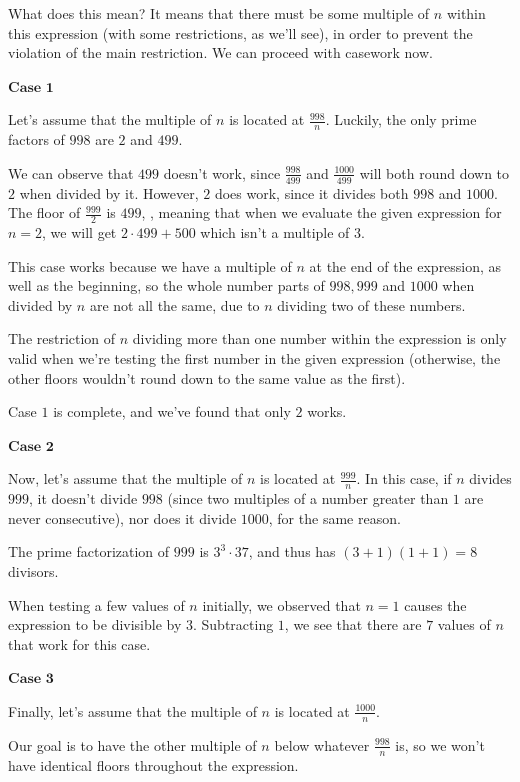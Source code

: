 \begin{enumerate}
 
What does this mean? It means that there must be some multiple of $n$ within this expression (with some restrictions, as we'll see), in order to prevent the violation of the main restriction. We can proceed with casework now.

 
$\textbf{Case 1}$

 
Let's assume that the multiple of $n$ is located at $\frac{998}{n}$. Luckily, the only prime factors of $998$ are $2$ and $499$. 

 
We can observe that $499$ doesn't work, since $\frac{998}{499}$ and $\frac{1000}{499}$ will both round down to $2$ when divided by it. However, $2$ does work, since it divides both $998$ and $1000$. The floor of $\frac{999}{2}$ is $499$, , meaning that when we evaluate the given expression for $n=2$, we will get $2\cdot{499}+500$ which isn't a multiple of $3$. 

 
This case works because we have a multiple of $n$ at the end of the expression, as well as the beginning, so the whole number parts of $998, 999$ and $1000$ when divided by $n$ are not all the same, due to $n$ dividing two of these numbers. 

 The restriction of $n$ dividing more than one number within the expression is only valid when we're testing the first number in the given expression (otherwise, the other floors wouldn't round down to the same value as the first). 

 Case $1$ is complete, and we've found that only $2$ works. 

 
$\textbf{Case 2}$

 Now, let's assume that the multiple of $n$ is located at $\frac{999}{n}$. In this case, if $n$ divides $999$, it doesn't divide $998$ (since two multiples of a number greater than $1$ are never consecutive), nor does it divide $1000$, for the same reason. 

 
The prime factorization of $999$ is $3^3\cdot37$, and thus has $(3+1)(1+1)=8$ divisors. 

 
When testing a few values of $n$ initially, we observed that $n=1$ causes the expression to be divisible by $3$. Subtracting $1$, we see that there are $7$ values of $n$ that work for this case.

 
$\textbf{Case 3}$

 Finally, let's assume that the multiple of $n$ is located at $\frac{1000}{n}.$

 
Our goal is to have the other multiple of $n$ below whatever $\frac{998}{n}$ is, so we won't have identical floors throughout the expression. 


\end{enumerate}
